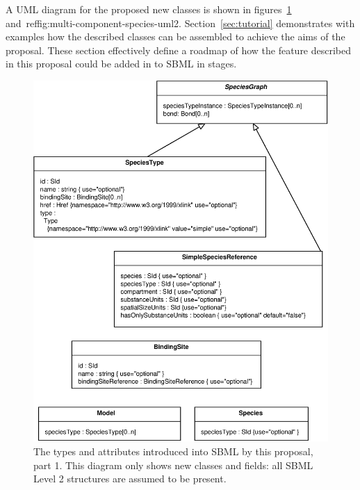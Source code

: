 \documentclass{cekarticle}
\begin{document}
A UML diagram for the proposed new classes is shown in
figures~\ref{fig:multi-component-species-uml} and~ref{fig:multi-component-species-uml2}.
Section~\ref{sec:tutorial}
demonstrates with examples how the described classes can be assembled to
achieve the aims of the proposal.  These section effectively define a roadmap
of how the feature described in this proposal could be added in to SBML in stages.

\begin{figure}[h]
  \vspace*{8pt}
  \centering
  \includegraphics[scale = 0.7]{multi-component-species-uml.eps}
  \caption{The types and attributes introduced into SBML by this proposal, part 1.  This diagram
  only shows new classes and fields: all SBML Level 2 structures are assumed to be present.}
  \label{fig:multi-component-species-uml}
\end{figure}
\end{document}
